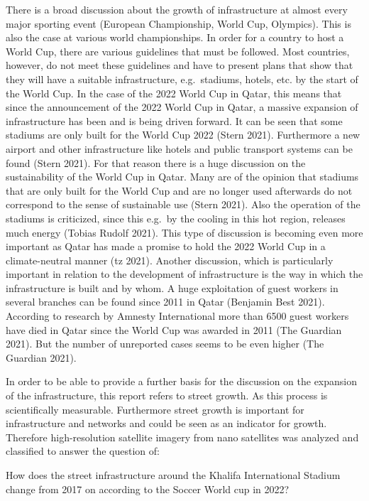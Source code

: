 \documentclass[
]{article}
\begin{document}
There is a broad discussion about the growth of infrastructure at almost
every major sporting event (European Championship, World Cup, Olympics).
This is also the case at various world championships. In order for a
country to host a World Cup, there are various guidelines that must be
followed. Most countries, however, do not meet these guidelines and have
to present plans that show that they will have a suitable
infrastructure, e.g.~stadiums, hotels, etc. by the start of the World
Cup. In the case of the 2022 World Cup in Qatar, this means that since
the announcement of the 2022 World Cup in Qatar, a massive expansion of
infrastructure has been and is being driven forward. It can be seen that
some stadiums are only built for the World Cup 2022 (Stern 2021).
Furthermore a new airport and other infrastructure like hotels and
public transport systems can be found (Stern 2021). For that reason
there is a huge discussion on the sustainability of the World Cup in
Qatar. Many are of the opinion that stadiums that are only built for the
World Cup and are no longer used afterwards do not correspond to the
sense of sustainable use (Stern 2021). Also the operation of the
stadiums is criticized, since this e.g.~by the cooling in this hot
region, releases much energy (Tobias Rudolf 2021). This type of
discussion is becoming even more important as Qatar has made a promise
to hold the 2022 World Cup in a climate-neutral manner (tz 2021).
Another discussion, which is particularly important in relation to the
development of infrastructure is the way in which the infrastructure is
built and by whom. A huge exploitation of guest workers in several
branches can be found since 2011 in Qatar (Benjamin Best 2021).
According to research by Amnesty International more than 6500 guest
workers have died in Qatar since the World Cup was awarded in 2011 (The
Guardian 2021). But the number of unreported cases seems to be even
higher (The Guardian 2021).

In order to be able to provide a further basis for the discussion on the
expansion of the infrastructure, this report refers to street growth. As
this process is scientifically measurable. Furthermore street growth is
important for infrastructure and networks and could be seen as an
indicator for growth. Therefore high-resolution satellite imagery from
nano satellites was analyzed and classified to answer the question of:

How does the street infrastructure around the Khalifa International
Stadium change from 2017 on according to the Soccer World cup in 2022?
\end{document}
